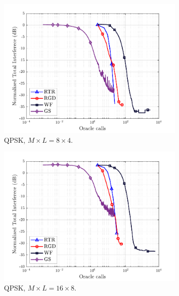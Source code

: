 \begin{figure}[ht]
	\centering
	\begin{subfigure}{0.48\linewidth}
		\centering
		\includegraphics[width=0.95\linewidth]{./figs/rocma_figs/ROCMA_MSR_TI_QgSt_oracles_4QAM_L=4_M=8_J=4_nSim_100.pdf}
		\caption{QPSK, $M\times L = 8\times4$.}\label{rocma:fig:CMA_ROCMA_oracles_8x4_4qam}
	\end{subfigure}
	\begin{subfigure}{0.48\linewidth}
		\centering
		\includegraphics[width=0.95\linewidth]{./figs/rocma_figs/ROCMA_MSR_TI_QgSt_oracles_4QAM_L=8_M=16_J=8_nSim_100.pdf}
		\caption{QPSK, $M\times L = 16\times8$.}\label{rocma:fig:CMA_ROCMA_oracles_16x8_4qam}
	\end{subfigure}
	\begin{subfigure}{0.48\linewidth}

\end{subfigure}
\end{figure}
